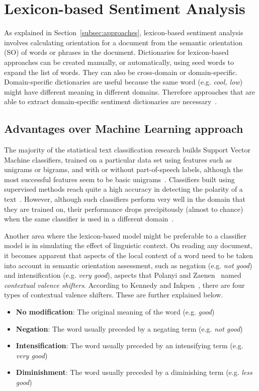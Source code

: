 \section{Lexicon-based Sentiment Analysis}
\label{sec:lexicon}

As explained in Section~\ref{subsec:approaches},
lexicon-based sentiment analysis involves calculating orientation for a document
from the semantic orientation (SO) of words or phrases in the document.
Dictionaries for lexicon-based approaches can be created manually,
or automatically, using seed words to expand the list of words.
They can also be cross-domain or domain-specific.
Domain-specific dictionaries are useful because the same word
(e.g. \emph{cool, low}) might have different meaning in different domains.
Therefore approaches that are able
to extract domain-specific sentiment dictionaries are necessary~\cite{AKKN14}.

\subsection{Advantages over Machine Learning approach}
\label{subsec:advantages}

The majority of the statistical text classification research builds
Support Vector Machine classifiers, trained on a particular data set
using features such as unigrams or bigrams,
and with or without part-of-speech labels,
although the most successful features seem to be basic unigrams~\cite{TBTV11}.
Classifiers built using supervised methods reach quite a high accuracy
in detecting the polarity of a text~\cite{CZ05}.
However, although such classifiers perform very well in the domain
that they are trained on,
their performance drops precipitously (almost to chance)
when the same classifier is used in a different domain~\cite{AG05}.

Another area where the lexicon-based model might be preferable
to a classifier model is in simulating the effect of linguistic context.
On reading any document, it becomes apparent that aspects of the local context of a word need to be taken into account in semantic orientation assessment,
such as negation (e.g. \emph{not good})
and intensification (e.g. \emph{very good}),
aspects that Polanyi and Zaenen~\cite{PZ06} named
\emph{contextual valence shifters}.
According to Kennedy and Inkpen~\cite{KI06},
there are four types of contextual valence shifters.
These are further explained below.

\begin{itemize}
 \item \textbf{No modification}: The original meaning of the word
 (e.g. \emph{good})
 \item \textbf{Negation}: The word usually preceded by a negating term
 (e.g. \emph{not good})
 \item \textbf{Intensification}: The word usually preceded by an intensifying term
 (e.g. \emph{very good})
 \item \textbf{Diminishment}: The word usually preceded by a diminishing term
 (e.g. \emph{less good})
\end{itemize}

